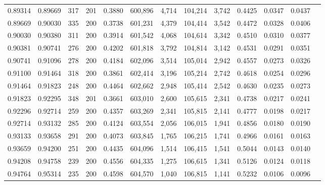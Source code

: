 \begin{tabular}{rrrrrrrrrrrrr}
0.89314 & 0.89669 &   317 & 201 &                                     0.3880 & 600,896 &   4,714 & 104,214 &   3,742 & 0.4425 & 0.0347 & 0.0437 \\
0.89669 & 0.90030 &   335 & 200 &                                     0.3738 & 601,231 &   4,379 & 104,414 &   3,542 & 0.4472 & 0.0328 & 0.0406 \\
0.90030 & 0.90380 &   311 & 200 &                                     0.3914 & 601,542 &   4,068 & 104,614 &   3,342 & 0.4510 & 0.0310 & 0.0377 \\
0.90381 & 0.90741 &   276 & 200 &                                     0.4202 & 601,818 &   3,792 & 104,814 &   3,142 & 0.4531 & 0.0291 & 0.0351 \\
0.90741 & 0.91096 &   278 & 200 &                                     0.4184 & 602,096 &   3,514 & 105,014 &   2,942 & 0.4557 & 0.0273 & 0.0326 \\
0.91100 & 0.91464 &   318 & 200 &                                     0.3861 & 602,414 &   3,196 & 105,214 &   2,742 & 0.4618 & 0.0254 & 0.0296 \\
0.91464 & 0.91823 &   248 & 200 &                                     0.4464 & 602,662 &   2,948 & 105,414 &   2,542 & 0.4630 & 0.0235 & 0.0273 \\
0.91823 & 0.92295 &   348 & 201 &                                     0.3661 & 603,010 &   2,600 & 105,615 &   2,341 & 0.4738 & 0.0217 & 0.0241 \\
0.92296 & 0.92714 &   259 & 200 &                                     0.4357 & 603,269 &   2,341 & 105,815 &   2,141 & 0.4777 & 0.0198 & 0.0217 \\
0.92714 & 0.93132 &   285 & 200 &                                     0.4124 & 603,554 &   2,056 & 106,015 &   1,941 & 0.4856 & 0.0180 & 0.0190 \\
0.93133 & 0.93658 &   291 & 200 &                                     0.4073 & 603,845 &   1,765 & 106,215 &   1,741 & 0.4966 & 0.0161 & 0.0163 \\
0.93659 & 0.94200 &   251 & 200 &                                     0.4435 & 604,096 &   1,514 & 106,415 &   1,541 & 0.5044 & 0.0143 & 0.0140 \\
0.94208 & 0.94758 &   239 & 200 &                                     0.4556 & 604,335 &   1,275 & 106,615 &   1,341 & 0.5126 & 0.0124 & 0.0118 \\
0.94764 & 0.95314 &   235 & 200 &                                     0.4598 & 604,570 &   1,040 & 106,815 &   1,141 & 0.5232 & 0.0106 & 0.0096 \\

\end{tabular}
